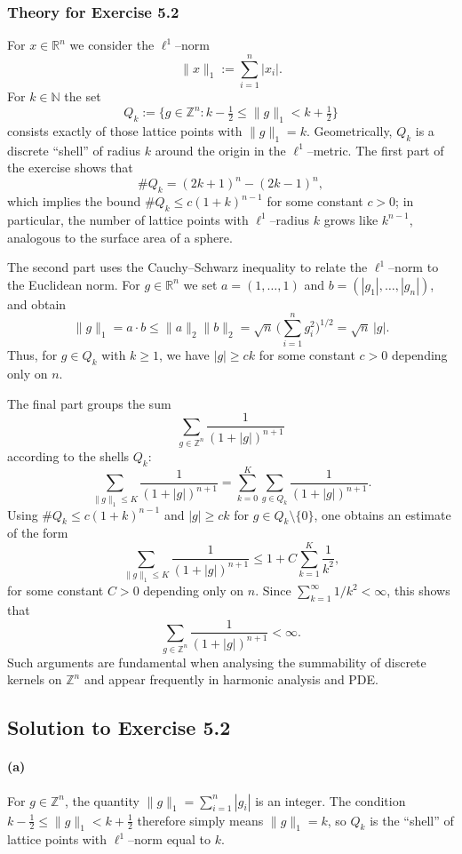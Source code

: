 \documentclass[12pt,a4paper]{article}
\theoremstyle{plain}
\theoremstyle{definition}
\theoremstyle{remark}
\theoremstyle{remark}
\begin{document}
\subsubsection*{Theory for Exercise 5.2}

For $x\in\mathbb{R}^n$ we consider the $\ell^1$--norm
\[
\|x\|_1 := \sum_{i=1}^n |x_i|.
\]
For $k\in\mathbb{N}$ the set
\[
Q_k := \bigl\{ g\in\mathbb{Z}^n :
k-\tfrac12 \le \|g\|_1 < k+\tfrac12 \bigr\}
\]
consists exactly of those lattice points with $\|g\|_1=k$.  Geometrically,
$Q_k$ is a discrete ``shell'' of radius $k$ around the origin in the
$\ell^1$--metric.  The first part of the exercise shows that
\[
\#Q_k = (2k+1)^n - (2k-1)^n,
\]
which implies the bound $\#Q_k \le c(1+k)^{n-1}$ for some constant $c>0$;
in particular, the number of lattice points with $\ell^1$--radius $k$
grows like $k^{n-1}$, analogous to the surface area of a sphere.

The second part uses the Cauchy--Schwarz inequality to relate the
$\ell^1$--norm to the Euclidean norm.  For $g\in\mathbb{R}^n$ we set
$a=(1,\dots,1)$ and $b=(|g_1|,\dots,|g_n|)$, and obtain
\[
\|g\|_1 = a\cdot b \le \|a\|_2\|b\|_2
= \sqrt{n}\,\biggl(\sum_{i=1}^n g_i^2\biggr)^{1/2}
= \sqrt{n}\,|g|.
\]
Thus, for $g\in Q_k$ with $k\ge1$, we have $|g|\ge c k$ for some constant
$c>0$ depending only on $n$.

The final part groups the sum
\[
\sum_{g\in\mathbb{Z}^n} \frac{1}{(1+|g|)^{n+1}}
\]
according to the shells $Q_k$:
\[
\sum_{\|g\|_1\le K} \frac{1}{(1+|g|)^{n+1}}
= \sum_{k=0}^K \sum_{g\in Q_k} \frac{1}{(1+|g|)^{n+1}}.
\]
Using $\#Q_k\le c(1+k)^{n-1}$ and $|g|\ge c k$ for $g\in Q_k\setminus\{0\}$,
one obtains an estimate of the form
\[
\sum_{\|g\|_1\le K} \frac{1}{(1+|g|)^{n+1}}
\le 1 + C \sum_{k=1}^K \frac{1}{k^2},
\]
for some constant $C>0$ depending only on $n$.  Since
$\sum_{k=1}^\infty 1/k^2<\infty$, this shows that
\[
\sum_{g\in\mathbb{Z}^n} \frac{1}{(1+|g|)^{n+1}} < \infty.
\]
Such arguments are fundamental when analysing the summability of discrete
kernels on $\mathbb{Z}^n$ and appear frequently in harmonic analysis and
PDE.

\subsection*{Solution to Exercise 5.2}

\paragraph{(a)}
For $g\in\mathbb{Z}^n$, the quantity $\|g\|_1=\sum_{i=1}^n|g_i|$ is an
integer.  The condition
$k-\tfrac12 \le \|g\|_1 < k+\tfrac12$ therefore simply means
$\|g\|_1=k$, so $Q_k$ is the ``shell'' of lattice points with
$\ell^1$--norm equal to $k$.
\end{document}
